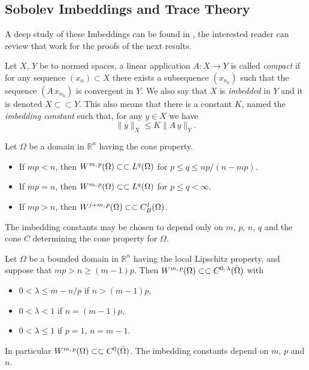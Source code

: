 \subsection*{Sobolev Imbeddings and Trace Theory}\label{sec:sobolev_imbeddings} A deep study of these Imbeddings can be found in \cite{adams1975}, the interested reader can review that work for the proofs of the next results.
\begin{definition}
Let $X$, $Y$ be to normed spaces, a linear application $A:X\rightarrow Y$ is called \emph{compact} if for any sequence $(x_n)\subset X$ there exists a subsequence $(x_{n_k})$ such that the sequence $(A\,x_{n_k})$ is convergent in $Y$. We also say that $X$ is \emph{imbedded} in $Y$ and it is denoted $X\subset\subset Y$. This also means that there is a constant $K$, named the \emph{imbedding constant} such that, for any $y\in X$ we have $$\|y\|_X\leq K \|A\,y\|_Y.$$
\end{definition}
\begin{theorem}
Let $\Omega$ be a domain in $\mathbb{R}^n$ having the cone property.
\begin{itemize}
\item If $mp<n$, then ${W^{m,\,p}(\Omega)}\subset \subset {L^{q}(\Omega)}$ for $p\leq q \leq np/(n-mp)$.
\item  If $mp=n$, then ${W^{m,\,p}(\Omega)}\subset \subset {L^{q}(\Omega)}$ for $p\leq q<\infty$.
\item  If $mp>n$, then ${W^{j+m,\,p}(\Omega)}\subset \subset C_B^j(\Omega)$.
\end{itemize}
 The imbedding constants may be chosen to depend only on  $m$, $p$, $n$, $q$ and the cone $C$ determining the cone property for $\Omega$.
\end{theorem}
\begin{theorem}
Let $\Omega$ be a bounded domain in $\mathbb{R}^n$ having the local Lipschitz property, and suppose that $mp>n\geq (m-1)p$. Then ${W^{m,\,p}(\Omega)}\subset \subset C^{0,\,\lambda}(\bar{\Omega})$ with
\begin{itemize}
\item $0<\lambda\leq m-n/p$ if $n>(m-1)p$,
\item $0<\lambda < 1$ if $n=(m-1)p$,
\item $0<\lambda \leq 1$ if $p=1$, $n=m-1$.
\end{itemize}
In particular ${W^{m,\,p}(\Omega)}\subset \subset C^0(\bar{\Omega})$. The imbedding constants depend on $m$, $p$ and $n$.
\end{theorem}
